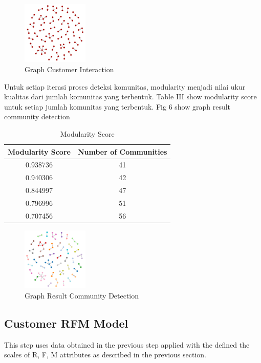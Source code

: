 \documentclass[conference]{IEEEtran}
\begin{document}
\begin{figure}[h]
\centering
\includegraphics[width=\columnwidth, height=3cm,keepaspectratio]{figure/graph_awal}
\caption{Graph Customer Interaction}
\label{graph_customer}
\end{figure}

Untuk setiap iterasi proses deteksi komunitas, modularity menjadi nilai ukur kualitas dari jumlah komunitas yang terbentuk. Table III show modularity score untuk setiap jumlah komunitas yang terbentuk. Fig 6 show graph result community detection

\begin{table}[h]
\renewcommand{\arraystretch}{1.3}
\caption{Modularity Score}
\label{tab:modularity_score}
\centering
\begin{tabular}{c|c}
    \hline
    Modularity Score  &  Number of Communities\\
    \hline
    0.938736 & 41\\
    \hline
    0.940306 & 42\\
    \hline
    0.844997 & 47\\
    \hline
    0.796996 & 51\\
    \hline
    0.707456 & 56\\
    \hline
\end{tabular}
\end{table}

\begin{figure}[h]
\centering
\includegraphics[width=\columnwidth, height=3cm,keepaspectratio]{figure/graph_deteksi}
\caption{Graph Result Community Detection}
\label{graph_community_detection}
\end{figure}

\subsection{Customer RFM Model}
This step uses data obtained in the previous step applied with the defined the scales of R, F, M attributes as described in the previous section.
\end{document}
